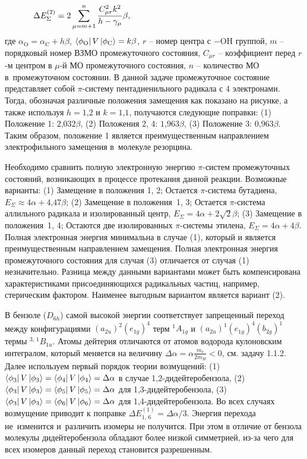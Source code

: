 \begin{equation*}
\begin{aligned}
& \Delta E_{\Sigma}^{(2)}=2\sum_{\mu = m+1}^{n} \frac{C_{\mu r}^2 k^2}{h-\gamma_{\mu}} \beta, \hspace{58mm}
\end{aligned}
\end{equation*}
где $\alpha_{\text{O}}=\alpha_{\text{C}}+h\beta$, $\bra{\phi_{\text{O}}} V \ket{\phi_{\text{C}}}=k\beta$, $r$ – номер центра с $-$OH группой, $m$ – порядковый номер ВЗМО промежуточного состояния, $C_{\mu r}$ – коэффициент перед $r$-м центром в $\mu$-й МО промежуточного состояния, $n$ – количество МО в~промежуточном состоянии. В данной задаче промежуточное состояние представляет собой $\pi$-систему пентадиенильного радикала с 4 электронами. Тогда, обозначая различные положения замещения как показано на рисунке, а также используя $h=\text{1,2}$ и $k=\text{1,1}$, получаются следующие поправки: (1) Положение 1: $\text{2,032}\beta$, (2) Положения 2, 4: $\text{1,963}\beta$, (3) Положение 3: $\text{0,963}\beta$. Таким образом, положение 1 является преимущественным направлением электрофильного замещения в~молекуле резорцина.\par
{} Необходимо сравнить полную электронную энергию $\pi$-систем промежуточных состояний, возникающих в процессе протекания данной реакции. Возможные варианты: (1) Замещение в положения 1, 2; Остается $\pi$-система бутадиена, $E_{\Sigma}\approx 4\alpha+4\text{,}47\beta$; (2) Замещение в положения~1, 3; Остается $\pi$-система аллильного радикала и изолированный центр, $E_{\Sigma}= 4\alpha+2\sqrt2\beta$; (3) Замещение в положения~1, 4; Остаются две изолированных $\pi$-системы этилена, $E_{\Sigma}= 4\alpha+4\beta$. Полная электронная энергия минимальна в случае (1), который и является преимущественным направлением замещения. Полная электронная энергия промежуточного состояния для случая (3) отличается от случая (1) незначительно. Разница между данными вариантами может быть компенсирована характеристиками присоединяющихся радикальных частиц, например, стерическим фактором. Наименее выгодным вариантом является вариант (2).\par
{} В бензоле ($D_{6h}$) самой высокой энергии соответствует запрещенный переход между конфигурациями $(a_{2u})^2(e_{1g})^4$ терм $^1{A_{1g}}$ и $(a_{2u})^1(e_{1g})^4(b_{2g})^1$ термы $^{3,\,1}B_{1u}$. Атомы дейтерия отличаются от атомов водорода кулоновским интегралом, который меняется на величину $\Delta \alpha =\alpha\frac{m_e}{2m_H} < 0$, см. задачу 1.1.2. Далее используем первый порядок теории возмущений: (1) $\bra{\phi_3}V\ket{\phi_3}=\bra{\phi_4}V\ket{\phi_4}=\Delta \alpha$ в случае 1,2-дидейтеробензола, (2)~$\bra{\phi_3}V\ket{\phi_3}=\bra{\phi_5}V\ket{\phi_5}=\Delta \alpha$ для 1,3-дидейтеробензола, (3)~$\bra{\phi_3}V\ket{\phi_3}=\bra{\phi_6}V\ket{\phi_6}=\Delta \alpha $ для 1,4-дидейтеробензола. Во всех случаях возмущение приводит к поправке $\Delta E_{1,\,6}^{(1)}= \Delta \alpha/3 $. Энергия перехода не~изменится и~различить изомеры не получится. При этом в отличие от бензола молекулы дидейтеробензола обладают более низкой симметрией, из-за чего для всех изомеров данный переход становится разрешенным.\par
